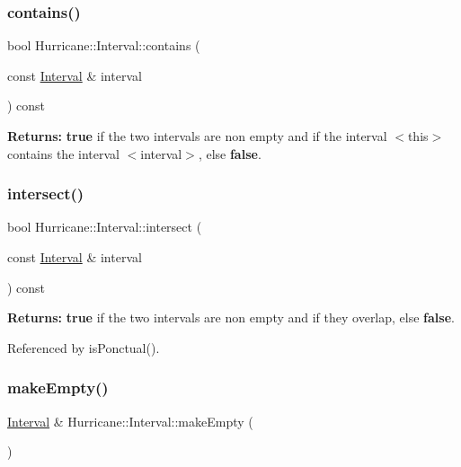 \mbox{\label{classHurricane_1_1Interval_ae86edb6867cf55459325cc35d971afbd}} 
\subsubsection{\texorpdfstring{contains()}{contains()}\hspace{0.1cm}{\footnotesize\ttfamily [2/2]}}
{\footnotesize\ttfamily bool Hurricane\+::\+Interval\+::contains (\begin{DoxyParamCaption}\item[{const \hyperlink{classHurricane_1_1Interval}{Interval} \&}]{interval }\end{DoxyParamCaption}) const}

{\bfseries Returns\+:} {\bfseries true} if the two intervals are non empty and if the interval {\ttfamily $<$this$>$} contains the interval {\ttfamily $<$interval$>$}, else {\bfseries false}. \mbox{\label{classHurricane_1_1Interval_acbaccbdd6649a32dd457455d277370f8}} 
\subsubsection{\texorpdfstring{intersect()}{intersect()}}
{\footnotesize\ttfamily bool Hurricane\+::\+Interval\+::intersect (\begin{DoxyParamCaption}\item[{const \hyperlink{classHurricane_1_1Interval}{Interval} \&}]{interval }\end{DoxyParamCaption}) const}

{\bfseries Returns\+:} {\bfseries true} if the two intervals are non empty and if they overlap, else {\bfseries false}. 

Referenced by is\+Ponctual().

\mbox{\label{classHurricane_1_1Interval_a1e171021dcd5c0dc7e8afb0b2324c5ee}} 
\subsubsection{\texorpdfstring{make\+Empty()}{makeEmpty()}}
{\footnotesize\ttfamily \hyperlink{classHurricane_1_1Interval}{Interval} \& Hurricane\+::\+Interval\+::make\+Empty (\begin{DoxyParamCaption}{ }\end{DoxyParamCaption})}

